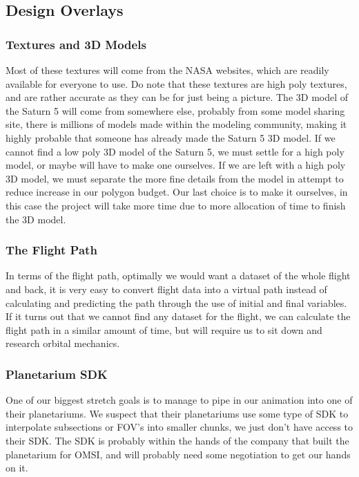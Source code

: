 \documentclass[onecolumn, draftclsnofoot,10pt, compsoc]{IEEEtran}
\begin{document}
    \subsection{Design Overlays} %
	\subsubsection{Textures and 3D Models}
	Most of these textures will come from the NASA websites, which are readily available for everyone to use. Do note that these textures are high poly textures, and are rather accurate as they can be for just being a picture. The 3D model of the Saturn 5 will come from somewhere else, probably from some model sharing site, there is millions of models made within the modeling community, making it highly probable that someone has already made the Saturn 5 3D model. If we cannot find a low poly 3D model of the Saturn 5, we must settle for a high poly model, or maybe will have to make one ourselves. If we are left with a high poly 3D model, we must separate the more fine details from the model in attempt to reduce increase in our polygon budget. Our last choice is to make it ourselves, in this case the project will take more time due to more allocation of time to finish the 3D model.
	\subsubsection{The Flight Path}
	In terms of the flight path, optimally we would want a dataset of the whole flight and back, it is very easy to convert flight data into a virtual path instead of calculating and predicting the path through the use of initial and final variables. If it turns out that we cannot find any dataset for the flight, we can calculate the flight path in a similar amount of time, but will require us to sit down and research orbital mechanics. 
	\subsubsection{Planetarium SDK}
	One of our biggest stretch goals is to manage to pipe in our animation into one of their planetariums. We suspect that their planetariums use some type of SDK to interpolate subsections or FOV's into smaller chunks, we just don't have access to their SDK. The SDK is probably within the hands of the company that built the planetarium for OMSI, and will probably need some negotiation to get our hands on it. 
\end{document}
